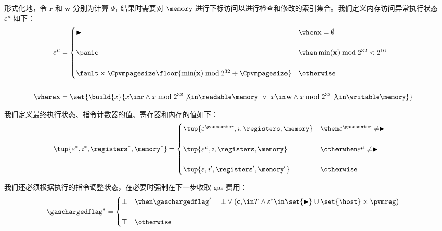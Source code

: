 形式化地，令 $\mathbf{r}$ 和 $\mathbf{w}$ 分别为计算 $\Psi_1$ 结果时需要对 $\mem$ 进行下标访问以进行检查和修改的索引集合。我们定义内存访问异常执行状态 $\varepsilon^\mu$ 如下：
\begin{equation}
  \begin{aligned}
    \varepsilon^{\mu} &= \begin{cases}
      \continue &\when \mathbf{x} = \emptyset \\\\
      \panic &\when \min(\mathbf{x}) \bmod 2^{32} < 2^{16} \\\\
      \fault \times \Cpvmpagesize\floor{\min(\mathbf{x}) \bmod 2^{32} \div \Cpvmpagesize} &\otherwise
    \end{cases}\\\\
    \where \mathbf{x} &= \set{\build{x}{x \in \mathbf{r} \wedge x \bmod 2^{32} \not\in \readable\mem\ \vee\ x \in \mathbf{w} \wedge x \bmod 2^{32} \not\in \writable\mem}}
  \end{aligned}
\end{equation}

我们定义最终执行状态、指令计数器的值、寄存器和内存的值如下：
\begin{align}
  \tup{\varepsilon^*, \imath^*, \registers^*, \mem^*} &= \begin{cases}
    \tup{\varepsilon^{\gascounter}, \imath, \registers, \mem} &\when \varepsilon^{\gascounter} \neq \continue \\\\
    \tup{\varepsilon^{\mu}, \imath, \registers, \mem} &\otherwhen \varepsilon^{\mu} \neq \continue \\\\
    \tup{\varepsilon, \imath', \registers', \mem'} &\otherwise
  \end{cases}
\end{align}

我们还必须根据执行的指令调整状态，在必要时强制在下一步收取 gas 费用：
\begin{equation}
  \gaschargedflag^* = \begin{cases}
    \bot &\when \gaschargedflag' = \bot \lor (\mathbf{c}_\imath \in T \land \varepsilon^* \in \set{\continue} \cup \set{\host} \times \pvmreg) \\\\
    \top &\otherwise
  \end{cases}
\end{equation}

